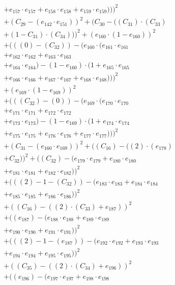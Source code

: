 \documentclass[10pt, a4paper]{article}
\begin{document}
\begin{small}
\begin{align*}
& + e_{157} \cdot e_{157} + e_{158} \cdot e_{158} + e_{159} \cdot e_{159})))^{2} \\
& + (C_{29} - (e_{142} \cdot e_{151}))^{2} + (C_{30} - ((C_{31})  \cdot  (C_{33}) \\
& + (1 - C_{31})  \cdot  (C_{34})))^{2} + (e_{160} \cdot (1 - e_{160}))^{2} \\
& + (((0) - (C_{32})) - (e_{160} \cdot (e_{161} \cdot e_{161} \\
& + e_{162} \cdot e_{162} + e_{163} \cdot e_{163} \\
& + e_{164} \cdot e_{164}) - (1 - e_{160}) \cdot (1 + e_{165} \cdot e_{165} \\
& + e_{166} \cdot e_{166} + e_{167} \cdot e_{167} + e_{168} \cdot e_{168})))^{2} \\
& + (e_{169} \cdot (1 - e_{169}))^{2} \\
& + (((C_{32}) - (0)) - (e_{169} \cdot (e_{170} \cdot e_{170} \\
& + e_{171} \cdot e_{171} + e_{172} \cdot e_{172} \\
& + e_{173} \cdot e_{173}) - (1 - e_{169}) \cdot (1 + e_{174} \cdot e_{174} \\
& + e_{175} \cdot e_{175} + e_{176} \cdot e_{176} + e_{177} \cdot e_{177})))^{2} \\
& + (C_{31} - (e_{160} \cdot e_{169}))^{2} + ((C_{16}) - ((2)  \cdot  (e_{178}) \\
& + C_{32}))^{2} + ((C_{32}) - (e_{179} \cdot e_{179} + e_{180} \cdot e_{180} \\
& + e_{181} \cdot e_{181} + e_{182} \cdot e_{182}))^{2} \\
& + (((2) - 1 - (C_{32})) - (e_{183} \cdot e_{183} + e_{184} \cdot e_{184} \\
& + e_{185} \cdot e_{185} + e_{186} \cdot e_{186}))^{2} \\
& + ((C_{16}) - ((2)  \cdot  (C_{33}) + e_{187}))^{2} \\
& + ((e_{187}) - (e_{188} \cdot e_{188} + e_{189} \cdot e_{189} \\
& + e_{190} \cdot e_{190} + e_{191} \cdot e_{191}))^{2} \\
& + (((2) - 1 - (e_{187})) - (e_{192} \cdot e_{192} + e_{193} \cdot e_{193} \\
& + e_{194} \cdot e_{194} + e_{195} \cdot e_{195}))^{2} \\
& + ((C_{35}) - ((2)  \cdot  (C_{34}) + e_{196}))^{2} \\
& + ((e_{196}) - (e_{197} \cdot e_{197} + e_{198} \cdot e_{198} \\

\end{align*}
\end{small}
\end{document}
